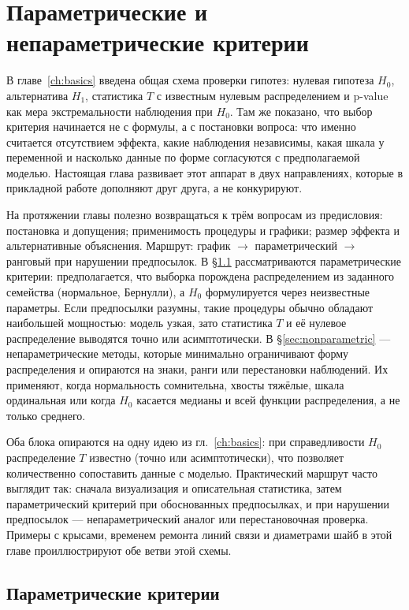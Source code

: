 \chapter{Параметрические и непараметрические критерии}
\label{ch:hypothesis}

В главе~\ref{ch:basics} введена общая схема проверки гипотез: нулевая гипотеза $H_0$, альтернатива $H_1$, статистика $T$ с известным нулевым распределением и p-value как мера экстремальности наблюдения при $H_0$.
Там же показано, что выбор критерия начинается не с формулы, а с постановки вопроса: что именно считается отсутствием эффекта, какие наблюдения независимы, какая шкала у переменной и насколько данные по форме согласуются с предполагаемой моделью.
Настоящая глава развивает этот аппарат в двух направлениях, которые в прикладной работе дополняют друг друга, а не конкурируют.


На протяжении главы полезно возвращаться к трём вопросам из предисловия: постановка и допущения; применимость процедуры и графики; размер эффекта и альтернативные объяснения. Маршрут: график $\to$ параметрический $\to$ ранговый при нарушении предпосылок. 
В \S\ref{sec:parametric} рассматриваются параметрические критерии: предполагается, что выборка порождена распределением из заданного семейства (нормальное, Бернулли), а $H_0$ формулируется через неизвестные параметры.
Если предпосылки разумны, такие процедуры обычно обладают наибольшей мощностью: модель узкая, зато статистика $T$ и её нулевое распределение выводятся точно или асимптотически.
В \S\ref{sec:nonparametric} --- непараметрические методы, которые минимально ограничивают форму распределения и опираются на знаки, ранги или перестановки наблюдений.
Их применяют, когда нормальность сомнительна, хвосты тяжёлые, шкала ординальная или когда $H_0$ касается медианы и всей функции распределения, а не только среднего.

Оба блока опираются на одну идею из гл.~\ref{ch:basics}: при справедливости $H_0$ распределение $T$ известно (точно или асимптотически), что позволяет количественно сопоставить данные с моделью.
Практический маршрут часто выглядит так: сначала визуализация и описательная статистика, затем параметрический критерий при обоснованных предпосылках, и при нарушении предпосылок --- непараметрический аналог или перестановочная проверка.
Примеры с крысами, временем ремонта линий связи и диаметрами шайб в этой главе проиллюстрируют обе ветви этой схемы.

\section{Параметрические критерии}
\label{sec:parametric}

